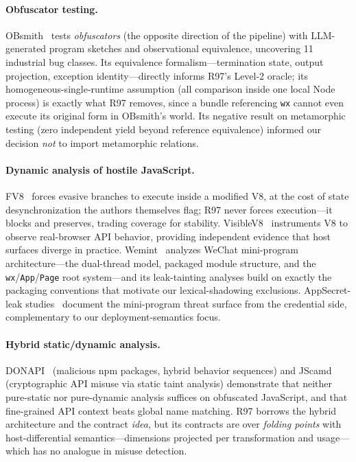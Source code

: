 \documentclass[sigconf,nonacm]{acmart}
\begin{document}
\paragraph{Obfuscator testing.} OBsmith~\cite{obsmith} tests \emph{obfuscators} (the opposite direction of the pipeline) with LLM-generated program sketches and observational equivalence, uncovering 11 industrial bug classes. Its equivalence formalism---termination state, output projection, exception identity---directly informs R97's Level-2 oracle; its homogeneous-single-runtime assumption (all comparison inside one local Node process) is exactly what R97 removes, since a bundle referencing \texttt{wx} cannot even execute its original form in OBsmith's world. Its negative result on metamorphic testing (zero independent yield beyond reference equivalence) informed our decision \emph{not} to import metamorphic relations.

\paragraph{Dynamic analysis of hostile JavaScript.} FV8~\cite{fv8} forces evasive branches to execute inside a modified V8, at the cost of state desynchronization the authors themselves flag; R97 never forces execution---it blocks and preserves, trading coverage for stability. VisibleV8~\cite{visiblev8} instruments V8 to observe real-browser API behavior, providing independent evidence that host surfaces diverge in practice. Wemint~\cite{wemint} analyzes WeChat mini-program architecture---the dual-thread model, packaged module structure, and the \texttt{wx}/\texttt{App}/\texttt{Page} root system---and its leak-tainting analyses build on exactly the packaging conventions that motivate our lexical-shadowing exclusions. AppSecret-leak studies~\cite{appsecret} document the mini-program threat surface from the credential side, complementary to our deployment-semantics focus.

\paragraph{Hybrid static/dynamic analysis.} DONAPI~\cite{donapi} (malicious npm packages, hybrid behavior sequences) and JScamd~\cite{jscamd} (cryptographic API misuse via static taint analysis) demonstrate that neither pure-static nor pure-dynamic analysis suffices on obfuscated JavaScript, and that fine-grained API context beats global name matching. R97 borrows the hybrid architecture and the contract \emph{idea}, but its contracts are over \emph{folding points} with host-differential semantics---dimensions projected per transformation and usage---which has no analogue in misuse detection.
\end{document}
